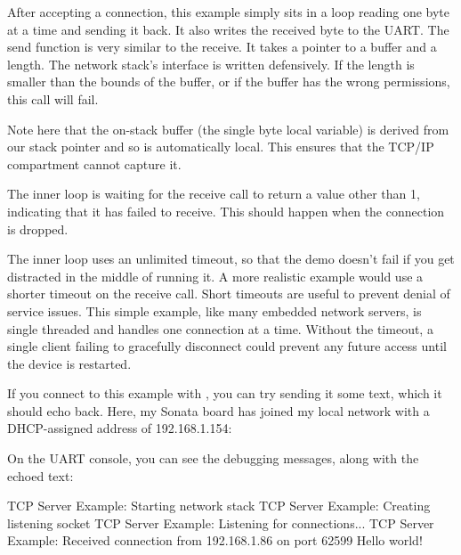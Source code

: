 {\codelisting[filename=examples/tcp_echo_server/tcp.cc,marker=accept,label=lst:tcpaccept,caption="Accepting TCP connections and running a simple echo-server loop."]{}

After accepting a connection, this example simply sits in a loop reading one byte at a time and sending it back.
It also writes the received byte to the UART.
The send function is very similar to the receive.
It takes a pointer to a buffer and a length.
The network stack's interface is written defensively.
If the length is smaller than the bounds of the buffer, or if the buffer has the wrong permissions, this call will fail.


Note here that the on-stack buffer (the single byte local variable) is derived from our stack pointer and so is automatically local.
This ensures that the TCP/IP compartment cannot capture it.

The inner loop is waiting for the receive call to return a value other than 1, indicating that it has failed to receive.
This should happen when the connection is dropped.

The inner loop uses an unlimited timeout, so that the demo doesn't fail if you get distracted in the middle of running it.
A more realistic example would use a shorter timeout on the receive call.
Short timeouts are useful to prevent denial of service issues.
This simple example, like many embedded network servers, is single threaded and handles one connection at a time.
Without the timeout, a single client failing to gracefully disconnect could prevent any future access until the device is restarted.

If you connect to this example with , you can try sending it some text, which it should echo back.
Here, my Sonata board has joined my local network with a DHCP-assigned address of 192.168.1.154:


On the UART console, you can see the debugging messages, along with the echoed text:

\begin{console}
TCP Server Example: Starting network stack
TCP Server Example: Creating listening socket
TCP Server Example: Listening for connections...
TCP Server Example: Received connection from 192.168.1.86 on port 62599
Hello world!
\end{console}

}
